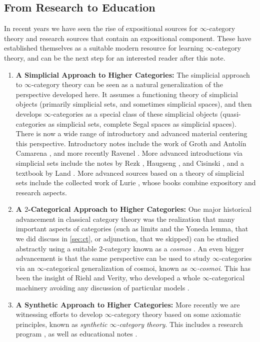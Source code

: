 \documentclass[11pt, a4paper]{amsart}
\theoremstyle{definition}
\theoremstyle{remark}
\numberwithin{equation}{section}
\begin{document}
\subsection{From Research to Education}
In recent years we have seen the rise of expositional sources for $\infty$-category theory and research sources that contain an expositional component. These have established themselves as a suitable modern resource for learning $\infty$-category theory, and can be the next step for an interested reader after this note.
\begin{enumerate}[leftmargin=*]
  \item \textbf{A Simplicial Approach to Higher Categories:} The simplicial approach to $\infty$-category theory can be seen as a natural generalization of the perspective developed here. It assumes a functioning theory of simplicial objects (primarily simplicial sets, and sometimes simplicial spaces), and then develops $\infty$-categories as a special class of these simplicial objects (quasi-categories as simplicial sets, complete Segal spaces as simplicial spaces). There is now a wide range of introductory and advanced material centering this perspective. Introductory notes include the work of Groth \cite{groth2010highercat} and Antol{\'i}n Camarena \cite{antolincamarena2016whirlwind}, and more recently Ravenel \cite{ravenel2023inftycategory}. More advanced introductions via simplicial sets include the notes by Rezk \cite{rezk2022qcats}, Haugseng \cite{haugseng2017qcats}, and Cisinski \cite{cisinski2019highercategories}, and a textbook by Land \cite{land2021infinitycategories}. More advanced sources based on a theory of simplicial sets include the collected work of Lurie \cite{lurie2009htt,lurie2017ha,lurie2026kerodon}, whose books combine expository and research aspects.
  \item \textbf{A $2$-Categorical Approach to Higher Categories:} One major historical advancement in classical category theory was the realization that many important aspects of categories (such as limits and the Yoneda lemma, that we did discuss in \cref{sec:ct}, or adjunction, that we skipped) can be studied abstractly using a suitable $2$-category known as a \emph{cosmos} \cite{street1974elementarycosmoi,street1980cosmoiinternalcategories}. An even bigger advancement is that the same perspective can be used to study $\infty$-categories via an $\infty$-categorical generalization of cosmoi, known as \emph{$\infty$-cosmoi}. This has been the insight of Riehl and Verity, who developed a whole $\infty$-categorical machinery avoiding any discussion of particular models \cite{riehlverity2017inftycosmos,riehlverity2022elements}.
  \item \textbf{A Synthetic Approach to Higher Categories:} More recently we are witnessing efforts to develop $\infty$-category theory based on some axiomatic principles, known as \emph{synthetic $\infty$-category theory}. This includes a research program \cite{cisinskicnossennguyenwalde2025higher}, as well as educational notes \cite{haugseng2025qcats}. 
\end{enumerate}
\end{document}
